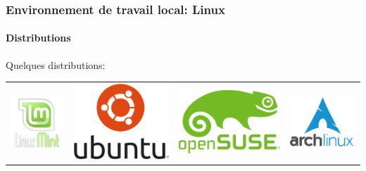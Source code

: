 \documentclass{beamer}
\begin{document}
\begin{frame}
\frametitle{Environnement de travail local: Linux}
\framesubtitle{Distributions}

Quelques distributions:

\begin{tabular}{llll}
	\includegraphics[width=.2\textwidth]{..//img/Bweb01-environnement/mint-logo.png} & \includegraphics[width=.2\textwidth]{..//img/Bweb01-environnement/ubuntu-logo.png} &
	\includegraphics[width=.2\textwidth]{..//img/Bweb01-environnement/opensuse-logo.png} &
	\includegraphics[width=.2\textwidth]{..//img/Bweb01-environnement/arch-logo.png} \\
	

\end{tabular}
\end{frame}
\end{document}
